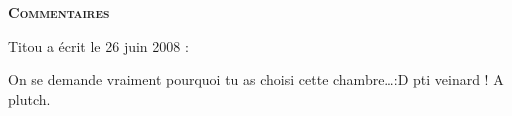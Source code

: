 \bigskip
\textbf{\textsc{Commentaires}}

\medskip
Titou a écrit le 26 juin 2008 :
\begin{displayquote}
On se demande vraiment pourquoi tu as choisi cette chambre\dots :D pti veinard !
A plutch.
\end{displayquote}

\vfill
